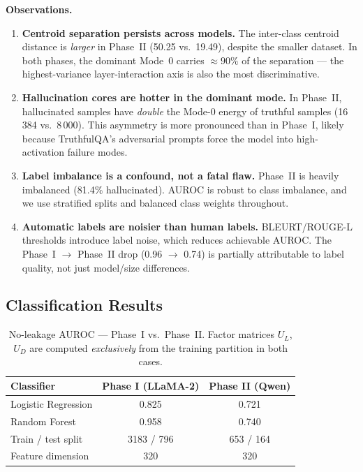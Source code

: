 \documentclass[11pt,a4paper]{article}
\begin{document}
\noindent
\textbf{Observations.}
\begin{enumerate}
  \item \textbf{Centroid separation persists across models.}
        The inter-class centroid distance is \emph{larger} in Phase~II (50.25
        vs.\ 19.49), despite the smaller dataset.  In both phases, the
        dominant Mode~0 carries $\approx 90\%$ of the separation — the
        highest-variance layer-interaction axis is also the most
        discriminative.

  \item \textbf{Hallucination cores are hotter in the dominant mode.}
        In Phase~II, hallucinated samples have \emph{double} the Mode-0 energy
        of truthful samples (16\,384 vs.\ 8\,000).  This asymmetry is more
        pronounced than in Phase~I, likely because TruthfulQA's adversarial
        prompts force the model into high-activation failure modes.

  \item \textbf{Label imbalance is a confound, not a fatal flaw.}
        Phase~II is heavily imbalanced (81.4\% hallucinated).  AUROC is
        robust to class imbalance, and we use stratified splits and balanced
        class weights throughout.

  \item \textbf{Automatic labels are noisier than human labels.}
        BLEURT/ROUGE-L thresholds introduce label noise, which reduces
        achievable AUROC.  The Phase~I $\to$ Phase~II drop (0.96 $\to$ 0.74)
        is partially attributable to label quality, not just model/size
        differences.
\end{enumerate}

\subsection{Classification Results}

\begin{table}[H]
\centering
\begin{tabular}{lcc}
\toprule
\textbf{Classifier} & \textbf{Phase I (LLaMA-2)} & \textbf{Phase II (Qwen)} \\
\midrule
Logistic Regression  & 0.825 & 0.721 \\
Random Forest        & 0.958 & 0.740 \\
\midrule
Train / test split   & 3183 / 796 & 653 / 164 \\
Feature dimension    & 320        & 320 \\
\bottomrule
\end{tabular}
\caption{No-leakage AUROC — Phase~I vs.\ Phase~II.  Factor matrices
         $U_L$, $U_D$ are computed \emph{exclusively} from the training
         partition in both cases.}
\end{table}
\end{document}
